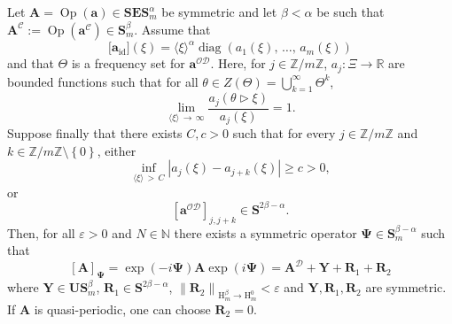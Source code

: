 \documentclass[AHL,Unicode,longabstracts,published]{cedram}
\DeclareMathOperator{\diag}{diag}
\DeclareMathOperator{\Op}{Op}
\DeclareMathOperator{\id}{id}
\renewcommand{\mathsf}{\mathrm}
\newcommand{\sfH}{\mathsf{H}}
\newcommand{\R}{\mathbb R}
\newcommand{\N}{\mathbb N}
\newcommand{\Z}{\mathbb Z}
\newcommand{\CC}{\mathcal{C}}
\newcommand{\CD}{\mathcal{D}}
\newcommand{\CO}{\mathcal{O}}
\newcommand{\COD}{{\CO\CD}}
\newcommand{\BPsi}{\boldsymbol \Psi}
\newcommand{\ba}{\mathbf a}
\newcommand{\BA}{\mathbf A}
\newcommand{\BE}{\mathbf E}
\newcommand{\BS}{\mathbf S}
\newcommand{\BR}{\mathbf R}
\newcommand{\BU}{\mathbf U}
\newcommand{\BY}{\mathbf Y}
\newcommand{\eps}{\varepsilon}
\newcommand{\act}{\triangleright}
\newcommand{\abs}[1]{\left\lvert #1 \right\rvert}
\newcommand{\set}[1]{\left\{ #1 \right\}}
\newcommand{\norm}[1]{\left\| #1 \right\|}
\newcommand{\ang}[1]{\langle #1 \rangle}
\begin{document}
\begin{theo}\label{thm:systemonestep}
Let $\BA = \Op(\ba) \in \BS\BE\BS_m^\alpha$ be symmetric and let $\beta <
\alpha$ be such that $\BA^{\CC}:= \Op(\ba^{\CC}) \in \BS^\beta_m$. Assume that
\begin{equation}
\big[\ba_{\id}\big]\left(\xi \right) = \ang \xi^\alpha
\diag(a_1(\xi),\,\dotsc,\,a_m(\xi))
\end{equation}
and that $\Theta$ is a frequency set for $\ba^\COD$. Here, for $j \in \Z/m\Z$, $a_j : \Xi \to \R$ are bounded functions such that for all $\theta \in Z(\Theta) = \bigcup_{k=1}^\infty \Theta^k$,
\begin{equation}\label{eq:shftinfty}
\lim_{\ang \xi\,\to\,\infty} \frac{a_j(\theta \act \xi)}{a_j(\xi)} = 1.
\end{equation}
Suppose finally that there exists $C, c> 0$ such that for every $j \in \Z/m\Z$ and $k \in \Z / m \Z
\setminus \set{0}$, either
\begin{equation}\label{eq:ajboundfrombelow}
\inf_{\ang \xi\,>\,C} \abs{a_j(\xi) - a_{j+k}(\xi)} \ge c > 0,
\end{equation}
or
\begin{equation}\label{eq:hypresonant}
\left[\ba^{\COD}\right]_{j,j+k} \in \BS^{2\beta - \alpha}.
\end{equation}
Then, for all $\eps > 0$ and $N \in \N$ there exists a symmetric operator $\BPsi \in \BS_m^{\beta - \alpha}$ such that
\begin{equation}\label{eq:desiredafteronestep}
[\BA]_{\BPsi} = \exp(-i\BPsi) \BA \exp(i\BPsi) = \BA^\CD + \BY + \BR_1 + \BR_2
\end{equation}
where $\BY \in \BU\BS_m^\beta$, $\BR_1 \in \BS^{2 \beta - \alpha}$, $\norm{\BR_2}_{\sfH^\beta_m \to \sfH_m^0} < \eps$ and $\BY, \BR_1,
\BR_2$ are symmetric. If $\BA$ is quasi-periodic, one can choose $\BR_2 = 0$.
\end{theo}
\end{document}
